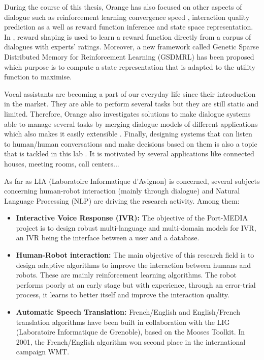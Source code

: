                 During the course of this thesis, Orange has also focused on other aspects of dialogue such as reinforcement learning convergence speed \cite{El-Asri2013a}, interaction quality prediction \cite{El-Asri2012,El-Asri2014d} as a well as reward function inference and state space representation. In \cite{El-Asri2012}, reward shaping is used to learn a reward function directly from a corpus of dialogues with experts' ratings. Moreover, a new framework called Genetic Sparse Distributed Memory for Reinforcement Learning (GSDMRL) has been proposed \cite{El-Asri2016} which purpose is to compute a state representation that is adapted to the utility function to maximise.
								
								Vocal assistants are becoming a part of our everyday life since their introduction in the market. They are able to perform several tasks but they are still static and limited. Therefore, Orange also investigates solutions to make dialogue systems able to manage several tasks by merging dialogue models of different applications which also makes it easily extensible \cite{EkeinhorKomi2014}. Finally, designing systems that can listen to human/human conversations and make decisions based on them is also a topic that is tackled in this lab \cite{Barlier2015}. It is motivated by several applications like connected houses, meeting rooms, call centers...

                As far as LIA (Laboratoire Informatique d'Avignon) is concerned, several subjects concerning human-robot interaction (mainly through dialogue) and Natural Language Processing (NLP) are driving the research activity. Among them:

                \begin{itemize}
                  \item \textbf{Interactive Voice Response (IVR):} The objective of the Port-MEDIA \cite{Lefevre2012} project is to design robust multi-language and multi-domain models for IVR, an IVR being the interface between a user and a database.
                  \item \textbf{Human-Robot interaction:} The main objective of this research field is to design adaptive algorithms to improve the interaction between humans and robots. These are mainly reinforcement learning algorithms. The robot performs poorly at an early stage but with experience, through an error-trial process, it learns to better itself and improve the interaction quality.
                  \item \textbf{Automatic Speech Translation:} French/English and English/French translation algorithms have been built in collaboration with the LIG (Laboratoire Informatique de Grenoble), based on the Mooses Toolkit. In 2001, the French/English algorithm won second place in the international campaign WMT.
                \end{itemize}

